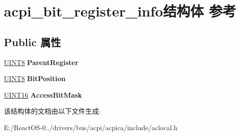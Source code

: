 \hypertarget{structacpi__bit__register__info}{}\section{acpi\+\_\+bit\+\_\+register\+\_\+info结构体 参考}
\label{structacpi__bit__register__info}
\subsection*{Public 属性}
\begin{DoxyCompactItemize}
\item 
\mbox{\label{structacpi__bit__register__info_a1e35f408a03739d0d73a86e81ae99fef}} 
\hyperlink{_processor_bind_8h_ab27e9918b538ce9d8ca692479b375b6a}{U\+I\+N\+T8} {\bfseries Parent\+Register}
\item 
\mbox{\label{structacpi__bit__register__info_a68ac28835daf5b86b8b2e1b4bc454528}} 
\hyperlink{_processor_bind_8h_ab27e9918b538ce9d8ca692479b375b6a}{U\+I\+N\+T8} {\bfseries Bit\+Position}
\item 
\mbox{\label{structacpi__bit__register__info_a8274d118499dc891e80862eddcf8f1e0}} 
\hyperlink{_processor_bind_8h_a09f1a1fb2293e33483cc8d44aefb1eb1}{U\+I\+N\+T16} {\bfseries Access\+Bit\+Mask}
\end{DoxyCompactItemize}


该结构体的文档由以下文件生成\+:\begin{DoxyCompactItemize}
\item 
E\+:/\+React\+O\+S-\/0../drivers/bus/acpi/acpica/include/aclocal.\+h\end{DoxyCompactItemize}
